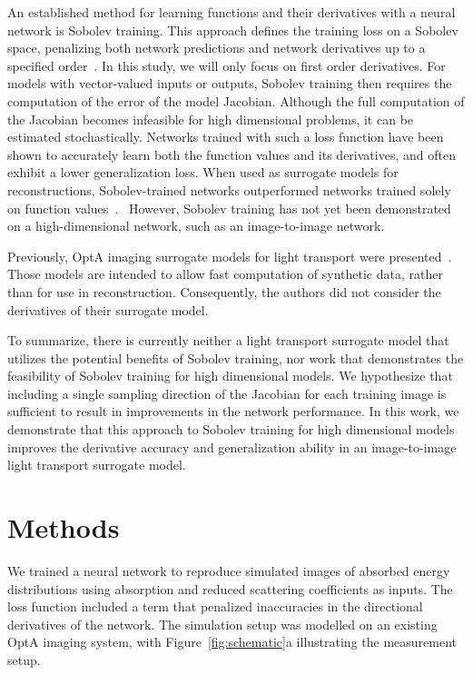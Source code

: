 \documentclass[journal,twoside,web]{ieeecolor}
\begin{document}
An established method for learning functions and their derivatives with a neural network is Sobolev training. %
This approach defines the training loss on a Sobolev space, penalizing both network predictions and network derivatives up to a specified order~\cite{Czarnecki2017}. %
In this study, we will only focus on first order derivatives. %
For models with vector-valued inputs or outputs, Sobolev training then requires the computation of the error of the model Jacobian. %
Although the full computation of the Jacobian becomes infeasible for high dimensional problems, it can be estimated stochastically. %
Networks trained with such a loss function have been shown to accurately learn both the function values and its derivatives, and often exhibit a lower generalization loss. %
When used as surrogate models for reconstructions, Sobolev-trained networks outperformed networks trained solely on function values~\cite{Laurent2019,Tsay2021}. %
 However, Sobolev training has not yet been demonstrated on a high-dimensional network, such as an image-to-image network.\par

Previously, OptA imaging surrogate models for light transport were presented~\cite{Rix2023}. %
Those models are intended to allow fast computation of synthetic data, rather than for use in reconstruction. %
Consequently, the authors did not consider the derivatives of their surrogate model.\par

To summarize, there is currently neither a light transport surrogate model that utilizes the potential benefits of Sobolev training, nor work that demonstrates the feasibility of Sobolev training for high dimensional models. %
We hypothesize that including a single sampling direction of the Jacobian for each training image is sufficient to result in improvements in the network performance. %
In this work, we demonstrate that this approach to Sobolev training for high dimensional models improves the derivative accuracy and generalization ability in an image-to-image light transport surrogate model.


\section{Methods}
We trained a neural network to reproduce simulated images of absorbed energy distributions using absorption and reduced scattering coefficients as inputs. %
The loss function included a term that penalized inaccuracies in the directional derivatives of the network. %
The simulation setup was modelled on an existing OptA imaging system, with Figure~\ref{fig:schematic}a illustrating the measurement setup.
\end{document}
